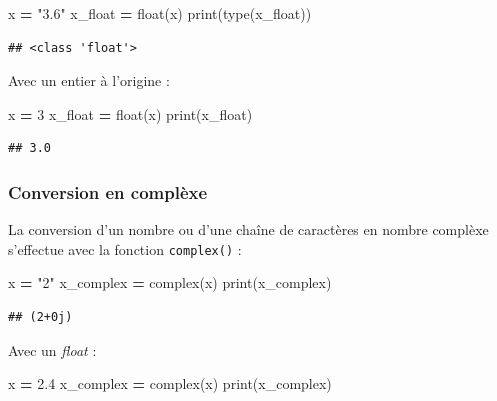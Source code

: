 \documentclass[12pt,]{book}
\newenvironment{Shaded}{\begin{snugshade}}{\end{snugshade}}
\newcommand{\DecValTok}[1]{\textcolor[rgb]{0.00,0.00,0.81}{#1}}
\newcommand{\FloatTok}[1]{\textcolor[rgb]{0.00,0.00,0.81}{#1}}
\newcommand{\StringTok}[1]{\textcolor[rgb]{0.31,0.60,0.02}{#1}}
\newcommand{\OperatorTok}[1]{\textcolor[rgb]{0.81,0.36,0.00}{\textbf{#1}}}
\newcommand{\BuiltInTok}[1]{#1}
\newcommand{\NormalTok}[1]{#1}
\numberwithin{equation}{section}
\numberwithin{countremarque}{section}
\begin{document}
\begin{Shaded}
\begin{Highlighting}[]
\NormalTok{x }\OperatorTok{=} \StringTok{"3.6"}
\NormalTok{x_float }\OperatorTok{=} \BuiltInTok{float}\NormalTok{(x)}
\BuiltInTok{print}\NormalTok{(}\BuiltInTok{type}\NormalTok{(x_float))}
\end{Highlighting}
\end{Shaded}

\begin{lstlisting}
## <class 'float'>
\end{lstlisting}

Avec un entier à l'origine :

\begin{Shaded}
\begin{Highlighting}[]
\NormalTok{x }\OperatorTok{=} \DecValTok{3}
\NormalTok{x_float }\OperatorTok{=} \BuiltInTok{float}\NormalTok{(x)}
\BuiltInTok{print}\NormalTok{(x_float)}
\end{Highlighting}
\end{Shaded}

\begin{lstlisting}
## 3.0
\end{lstlisting}

\subsubsection{Conversion en complèxe}\label{conversion-en-complexe}

La conversion d'un nombre ou d'une chaîne de caractères en nombre
complèxe s'effectue avec la fonction \texttt{complex()} :

\begin{Shaded}
\begin{Highlighting}[]
\NormalTok{x }\OperatorTok{=} \StringTok{"2"}
\NormalTok{x_complex }\OperatorTok{=} \BuiltInTok{complex}\NormalTok{(x)}
\BuiltInTok{print}\NormalTok{(x_complex)}
\end{Highlighting}
\end{Shaded}

\begin{lstlisting}
## (2+0j)
\end{lstlisting}

Avec un \emph{float} :

\begin{Shaded}
\begin{Highlighting}[]
\NormalTok{x }\OperatorTok{=} \FloatTok{2.4}
\NormalTok{x_complex }\OperatorTok{=} \BuiltInTok{complex}\NormalTok{(x)}
\BuiltInTok{print}\NormalTok{(x_complex)}
\end{Highlighting}
\end{Shaded}
\end{document}
